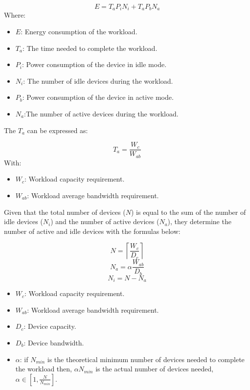 \begin{equation}
    E = T_a P_i N_i + T_a P_b N_a
\end{equation}
Where:

\begin{itemize}
    \item $E$: Energy consumption of the workload.
    \item $T_a$: The time needed to complete the workload.
    \item $P_i$: Power consumption  of the device in idle mode.
    \item $N_i$: The number of idle devices during the workload.
    \item $P_b$: Power consumption of the device in active mode.
    \item $N_a$:The number of active devices during the workload.
\end{itemize}

The $T_a$ can be expressed as: 

\begin{equation}
    T_a = \frac{W_c}{W_{ab}}
\end{equation}
With:
\begin{itemize}
    \item $W_c$: Workload capacity requirement.
    \item $W_{ab}$: Workload average bandwidth requirement.
\end{itemize}

Given that the total number of devices ($N$) is equal to the sum of the number of idle devices ($N_i$) and the number of active devices ($N_a$), they determine the number of active and idle devices with the formulas below:

\begin{equation}
    N = \left \lceil {\frac{W_c}{D_c}} \right \rceil
\end{equation}
\begin{equation}
    N_a = \alpha \frac{W_{ab}}{D_b}
\end{equation}
\begin{equation}
    N_i = N - N_a
\end{equation}

\begin{itemize}
    \item $W_c$: Workload capacity requirement.
    \item $W_{ab}$: Workload average bandwidth requirement.
    \item $D_c$: Device capacity.
    \item $D_b$: Device bandwidth.
    \item $\alpha$: if $N_{min}$ is the theoretical minimum number of devices needed to complete the workload then, $\alpha N_{min}$ is the actual number of devices needed, $\alpha \in [1,\frac{N}{N_{min}}]$.
\end{itemize}


